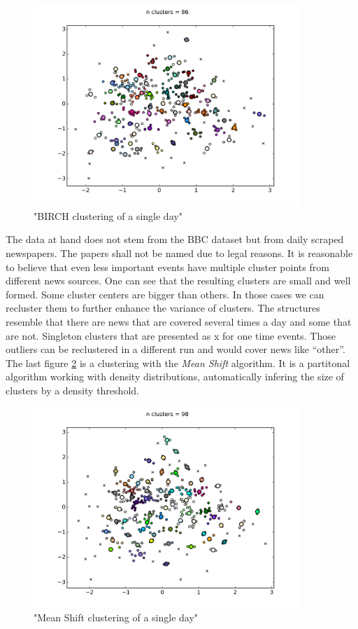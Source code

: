   \begin{figure}[h!]
    \centering
      \includegraphics[width=0.9\textwidth]{birch_clustering.png}
      \caption{"BIRCH clustering of a single day"}
      \label{birch_clustering}
  \end{figure}

The data at hand does not stem from the BBC dataset but from daily scraped newspapers. The papers shall not be named due to legal reasons. It is reasonable to believe that even less important events have multiple cluster points from different news sources. One can see that the resulting clusters are small and well formed. Some cluster centers are bigger than others. In those cases we can recluster them to further enhance the variance of clusters. The structures resemble that there are news that are covered several times a day and some that are not. Singleton clusters that are presented as x for one time events. Those outliers can be reclustered in a different run and would cover news like ``other''. The last figure \ref{mean_shift_clustering} is a clustering with the \emph{Mean Shift} algorithm. It is a partitonal algorithm working with density distributions, automatically infering the size of clusters by a density threshold.

  \begin{figure}[h!]
    \centering
      \includegraphics[width=0.9\textwidth]{mean_shift_clustering.png}
      \caption{"Mean Shift clustering of a single day"}
      \label{mean_shift_clustering}
  \end{figure} 

